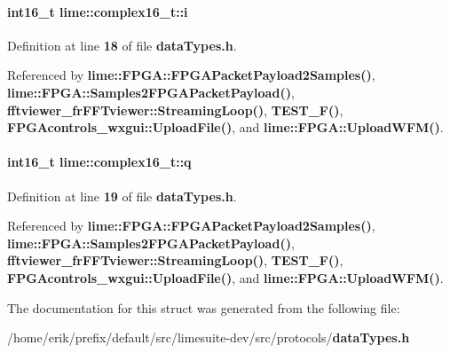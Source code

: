 \paragraph[{i}]{\setlength{\rightskip}{0pt plus 5cm}int16\+\_\+t lime\+::complex16\+\_\+t\+::i}\label{structlime_1_1complex16__t_acc9a7817fe710cb2cbccb26fe6bf6f41}


Definition at line {\bf 18} of file {\bf data\+Types.\+h}.



Referenced by {\bf lime\+::\+F\+P\+G\+A\+::\+F\+P\+G\+A\+Packet\+Payload2\+Samples()}, {\bf lime\+::\+F\+P\+G\+A\+::\+Samples2\+F\+P\+G\+A\+Packet\+Payload()}, {\bf fftviewer\+\_\+fr\+F\+F\+Tviewer\+::\+Streaming\+Loop()}, {\bf T\+E\+S\+T\+\_\+\+F()}, {\bf F\+P\+G\+Acontrols\+\_\+wxgui\+::\+Upload\+File()}, and {\bf lime\+::\+F\+P\+G\+A\+::\+Upload\+W\+F\+M()}.

\paragraph[{q}]{\setlength{\rightskip}{0pt plus 5cm}int16\+\_\+t lime\+::complex16\+\_\+t\+::q}\label{structlime_1_1complex16__t_ac1617452a024dadc3dbbd796a71af2ff}


Definition at line {\bf 19} of file {\bf data\+Types.\+h}.



Referenced by {\bf lime\+::\+F\+P\+G\+A\+::\+F\+P\+G\+A\+Packet\+Payload2\+Samples()}, {\bf lime\+::\+F\+P\+G\+A\+::\+Samples2\+F\+P\+G\+A\+Packet\+Payload()}, {\bf fftviewer\+\_\+fr\+F\+F\+Tviewer\+::\+Streaming\+Loop()}, {\bf T\+E\+S\+T\+\_\+\+F()}, {\bf F\+P\+G\+Acontrols\+\_\+wxgui\+::\+Upload\+File()}, and {\bf lime\+::\+F\+P\+G\+A\+::\+Upload\+W\+F\+M()}.



The documentation for this struct was generated from the following file\+:\begin{DoxyCompactItemize}
\item 
/home/erik/prefix/default/src/limesuite-\/dev/src/protocols/{\bf data\+Types.\+h}\end{DoxyCompactItemize}
